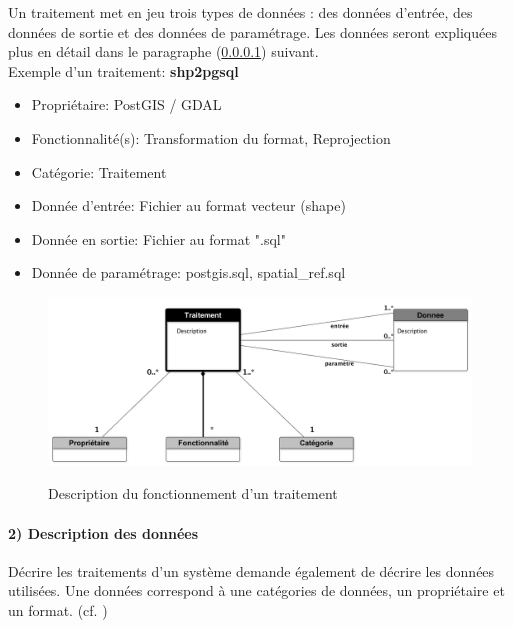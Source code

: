 Un traitement met en jeu trois types de données : des données d'entrée, des données de sortie et des données de paramétrage. Les données seront expliquées plus en détail dans le paragraphe (\ref{descrDonnes}) suivant.\\

Exemple d'un traitement: \textbf{shp2pgsql\\}
\begin{itemize}

\item Propriétaire: PostGIS / GDAL
\item Fonctionnalité(s): Transformation du format, Reprojection
\item Catégorie: Traitement
\item Donnée d'entrée: Fichier au format vecteur (shape)
\item Donnée en sortie: Fichier au format ".sql"
\item Donnée de paramétrage: postgis.sql, spatial\_ref.sql

\end{itemize}

\begin{figure}[H] 
\begin{center}
\includegraphics[width=15cm]{DescriptionTraitement5712.png}\\
\caption{\label{TraitementModele} Description du fonctionnement d'un traitement}
\end{center}
\end{figure}

\newpage
\paragraph{2) Description des données\\} \label{descrDonnes}

Décrire les traitements d'un système demande également de décrire les données utilisées. Une données correspond à une catégories de données, un  propriétaire et un format. (cf. \citep{ElKader2006}) \\

